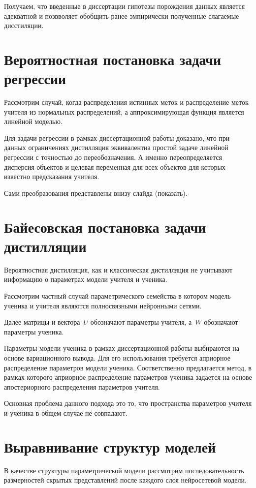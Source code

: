 \documentclass[10pt, twoside]{article}
\begin{document}
Получаем, что введенные в диссертации гипотезы порождения данных является адекватной и позвволяет обобщить ранее эмпирически полученные слагаемые дисстиляции.

\section{Вероятностная постановка задачи регрессии}

Рассмотрим случай, когда распределения истинных меток и распределение меток учителя из нормальных распределений, а аппроксимирующая функция является линейной моделью.

Для задачи регрессии в рамках диссертационной работы доказано, что при данных ограничениях дистилляция эквивалентна простой задаче линейной регрессии с точностью до переобозначения. А именно переопределяется дисперсия объектов и целевая переменная для всех объектов для которых известно предсказания учителя.

Сами преобразования представлены внизу слайда (показать). 

\section{Байесовская постановка задачи дистилляции}
Вероятностная дистилляция, как и классическая дистилляция не учитывают информацию о параметрах модели учителя и ученика.

Рассмотрим частный случай параметрического семейства в котором модель ученика и учителя являются полносвязными нейронными сетями.

Далее матрицы и вектора~$U$ обозначают параметры учителя, а~$W$ обозначают параметры ученика.

Параметры модели ученика в рамках диссертационной работы выбираются на основе вариационного вывода. Для его использования требуется априорное распределение параметров модели ученика. Соответственно предлагается метод, в рамках которого априорное распределение параметров ученика задается на основе апостериорного распределения параметров учителя.

Основная проблема данного подхода это то, что пространства параметров учителя и ученика в общем случае не совпадают.

\section{Выравнивание структур моделей}
В качестве структуры параметрической модели рассмотрим последовательность размерностей скрытых представлений после каждого слоя нейросетевой модели.
\end{document}
